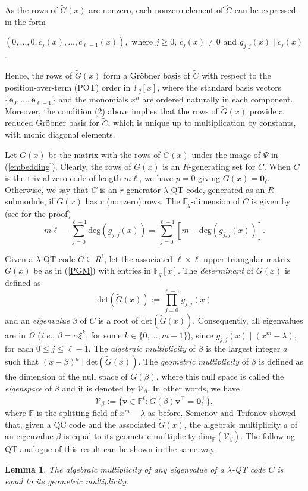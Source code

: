 \documentclass[11pt]{amsart}
\theoremstyle{plain}
\newtheorem{lem}[thm]{Lemma}
\theoremstyle{definition}
\numberwithin{equation}{section}
\newcommand{\Fq}{\mathbb{F}_{q}}
\newcommand{\F}{{\mathbb F}}
\begin{document}
As the rows of $\widetilde{G}(x)$ are nonzero, each nonzero element of $\widetilde{C}$ can be expressed in the form \begin{center}$(0,\ldots,0,c_j(x),\ldots,c_{\ell-1}(x)),$ where $j\geq 0$, $ c_j(x)\neq 0$ and $g_{j,j}(x)\mid c_j(x)$. \end{center} Hence, the rows of $\widetilde{G}(x)$ form a Gr\"obner basis of $\widetilde{C}$ with respect to the position-over-term (POT) order in $\Fq[x]$, where the standard basis vectors $\{\mathbf{e}_0,\ldots,\mathbf{e}_{\ell-1}\}$ and the monomials $x^n$ are ordered naturally in each component. Moreover, the condition (2) above implies that the rows of $\widetilde{G}(x)$ provide a reduced Gr\"obner basis for $\widetilde{C}$, which is unique up to multiplication by constants, with monic diagonal elements.

Let $G(x)$ be the matrix with the rows of $\widetilde{G}(x)$ under the image of $\Psi$ in (\ref{embedding}). Clearly, the rows of $G(x)$ is an $R$-generating set for $C$. When $C$ is the trivial zero code of length $m\ell$, we have $p=0$ giving $G(x)=\mathbf{0}_{\ell}$. Otherwise, we say that $C$ is an $r$-generator $\lambda$-QT code, generated as an $R$-submodule, if $G(x)$ has $r$ (nonzero) rows. The $\Fq$-dimension of $C$ is given by (see \cite[Corollary 2.4]{LF} for the proof) 
\begin{equation}\label{dimension}
m\ell-\sum_{j=0}^{\ell-1}\mbox{deg}(g_{j,j}(x))=\sum_{j=0}^{\ell-1}\left[m -\mbox{deg}(g_{j,j}(x))\right].
\end{equation}

Given a $\lambda$-QT code $C\subseteq R^{\ell}$, let the associated $\ell \times \ell$ upper-triangular matrix $\widetilde{G}(x)$ be as in (\ref{PGM}) with entries in $\Fq[x]$. The {\it determinant} of $\widetilde{G}(x)$ is defined as $$\mbox{det}(\widetilde{G}(x)):=\prod_{j=0}^{\ell-1}g_{j,j}(x)$$ and an {\it eigenvalue} $\beta$ of $C$ is a root of det$(\widetilde{G}(x))$. Consequently, all eigenvalues are in $\Omega$ ({\it i.e.}, $\beta=\alpha\xi^k$, for some $k\in\{0,\ldots,m-1\}$), since $g_{j,j}(x)\mid (x^m-\lambda)$, for each $0\leq j\leq \ell-1$. The {\it algebraic multiplicity} of $\beta$ is the largest integer $a$ such that $(x-\beta)^a\mid\mbox{det}(\widetilde{G}(x))$. The {\it geometric multiplicity} of $\beta$ is defined as the dimension of the null space of $\widetilde{G}(\beta)$, where this null space is called the {\it eigenspace} of $\beta$ and it is denoted by $\mathcal{V}_{\beta}$. In other words, we have $$\mathcal{V}_{\beta}:=\{\mathbf{v}\in\F^{\ell} : \widetilde{G}(\beta)\mathbf{v}^{\top}=\mathbf{0}_{\ell}^{\top}\},$$ where $\F$ is the splitting field of $x^m-\lambda$ as before. Semenov and Trifonov \cite{ST} showed that, given a QC code and the associated $\widetilde{G}(x)$, the algebraic multiplicity $a$ of an eigenvalue $\beta$ is equal to its geometric multiplicity $\mbox{dim}_{\F}(\mathcal{V}_{\beta})$. The following QT analogue of this result can be shown in the same way.
\begin{lem}\cite[Lemma 1]{ST}\label{multiplicity lemma}
The algebraic multiplicity of any eigenvalue of a $\lambda$-QT code $C$ is equal to its geometric multiplicity.
\end{lem}
\end{document}

